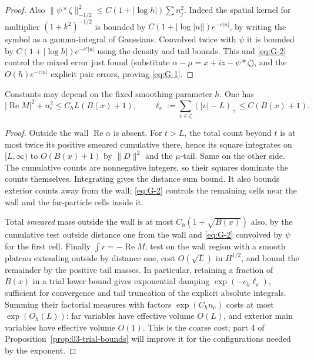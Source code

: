 \begin{proof}
Also \(\|\psi*\zeta\|_{-1/2}^2\le C(1+|\log h|)\sum n_j^2\). Indeed the spatial kernel for multiplier \((1+k^2)^{-1/2}\) is bounded by \(C(1+|\log|u||)e^{-c|u|}\), by writing the symbol as a gamma-integral of Gaussians. Convolved twice with \(\psi\) it is bounded by \(C(1+|\log h|)e^{-c'|u|}\) using the density and tail bounds. This and \eqref{eq:G-2} control the mixed error just found (substitute \(\alpha-\mu=x+i z-\psi*\zeta\)), and the \(O(h)e^{-c|u|}\) explicit pair errors, proving \eqref{eq:G-1}.

\end{proof}

\begin{corollary}\label{cor:03-counts}\label{E:explicit-counts}
Constants may depend on the fixed smoothing parameter \(h\). One has
\begin{equation}
 |\operatorname{Re}M|^2+n_e^2\le C_h L(B(x)+1),\qquad
 \ell_e:=\sum_{v\in\zeta} (|v|-L)_+\le C(B(x)+1).
 \label{eq:G-3}
\end{equation}
\end{corollary}
\begin{proof}
Outside the wall \(\operatorname{Re}\alpha\) is absent. For \(t>L\), the total count beyond \(t\) is at most twice its positive smeared cumulative there, hence its square integrates on \([L,\infty)\) to \(O(B(x)+1)\) by \(\|D\|^2\) and the \(\mu\)-tail. Same on the other side. The cumulative counts are nonnegative integers, so their squares dominate the counts themselves. Integrating gives the distance sum bound. It also bounds exterior counts away from the wall; \eqref{eq:G-2} controls the remaining cells near the wall and the far-particle cells inside it.

Total \emph{smeared} mass outside the wall is at most \(C_h(1+\sqrt{B(x)})\) also, by the cumulative test outside distance one from the wall and \eqref{eq:G-2} convolved by \(\psi\) for the first cell. Finally \(\int r=-\operatorname{Re}M\); test on the wall region with a smooth plateau extending outside by distance one, cost \(O(\sqrt L)\) in \(H^{1/2}\), and bound the remainder by the positive tail masses. In particular, retaining a fraction of \(B(x)\) in a trial lower bound gives exponential damping \(\exp(-c_h\ell_e)\), sufficient for convergence and tail truncation of the explicit absolute integrals. Summing their factorial measures with factors \(\exp(C_hn_e)\) costs at most \(\exp(O_h(L))\): far variables have effective volume \(O(L)\), and exterior main variables have effective volume \(O(1)\). This is the coarse cost; part 4 of Proposition~\ref{prop:03-trial-bounds} will improve it for the configurations needed by the exponent.

\end{proof}

